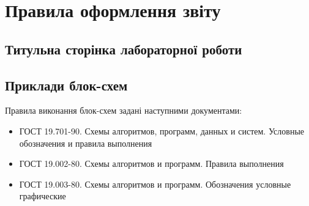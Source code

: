 \chapter{Правила оформлення звіту}
\section{Титульна сторінка лабораторної роботи}

\section{Приклади блок-схем}
Правила виконання блок-схем задані наступними документами:
\begin{itemize}
\item ГОСТ 19.701-90. Схемы алгоритмов, программ, данных и систем. Условные обозначения и правила выполнения
\item ГОСТ 19.002-80. Схемы алгоритмов и программ. Правила выполнения
\item ГОСТ 19.003-80. Схемы алгоритмов и программ. Обозначения условные графические

\end{itemize}




